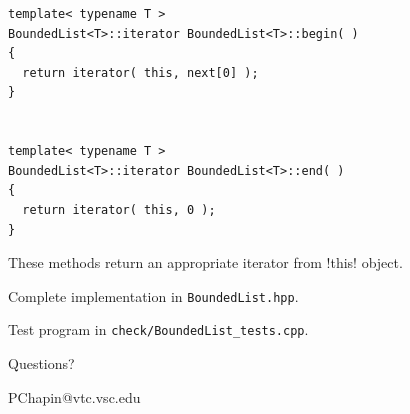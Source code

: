 \documentclass[landscape]{slides}
\begin{document}
{\small
\begin{lstlisting}
template< typename T >
BoundedList<T>::iterator BoundedList<T>::begin( )
{
  return iterator( this, next[0] );
}


template< typename T >
BoundedList<T>::iterator BoundedList<T>::end( )
{
  return iterator( this, 0 );
}
\end{lstlisting}
}
These methods return an appropriate iterator from !this! object.
\stopslide


\begin{citemize}
\item Complete implementation in \texttt{BoundedList.hpp}.
\item Test program in \texttt{check/BoundedList\_tests.cpp}.
\end{citemize}
\centerline{Questions?}
\makeatletter
\centerline{PChapin@vtc.vsc.edu}
\makeatother
\stopslide
\end{document}
